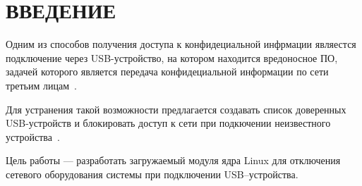 \chapter*{ВВЕДЕНИЕ}

Одним из способов получения доступа к конфидециальной инфрмации являестся подключение через USB-устройство, на котором находится вредоносное ПО, задачей которого является передача конфидециальной информации по сети третьим лицам~\cite{usbmalware}.

Для устранения такой возможности предлагается создавать список доверенных USB-устройств и блокировать доступ к сети при подкючении неизвестного устройства~\cite{usbdrop}.

Цель работы --- разработать загружаемый модуля ядра Linux для отключения сетевого оборудования системы при подключении USB--устройства.